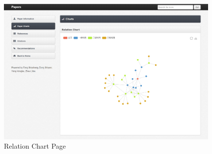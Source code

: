 \documentclass{book}
\begin{document}
\begin{figure}[htp]
\centering
\includegraphics[width=11cm]{img/zlt_rel_demo.png}
\caption{Relation Chart Page}
\end{figure}
\end{document}
